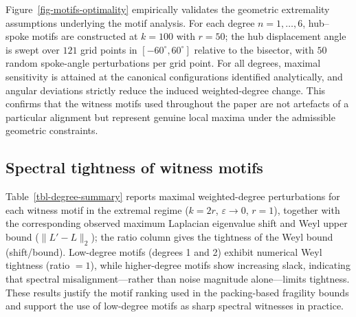 \documentclass[
  11pt,
  letterpaper]{siamart251216}
\begin{document}
Figure~\ref{fig-motifs-optimality} empirically validates the geometric
extremality assumptions underlying the motif analysis. For each degree
\(n=1,\dots,6\), hub--spoke motifs are constructed at \(k=100\) with
\(r=50\); the hub displacement angle is swept over \(121\) grid points
in \([-60^\circ,60^\circ]\) relative to the bisector, with \(50\) random
spoke-angle perturbations per grid point. For all degrees, maximal
sensitivity is attained at the canonical configurations identified
analytically, and angular deviations strictly reduce the induced
weighted-degree change. This confirms that the witness motifs used
throughout the paper are not artefacts of a particular alignment but
represent genuine local maxima under the admissible geometric
constraints.

\subsection{Spectral tightness of witness
motifs}\label{sec-motif-tightness-results}

Table~\ref{tbl-degree-summary} reports maximal weighted-degree
perturbations for each witness motif in the extremal regime (\(k=2r\),
\(\varepsilon\to 0\), \(r=1\)), together with the corresponding observed
maximum Laplacian eigenvalue shift and Weyl upper bound
(\(\|L'-L\|_2\)); the ratio column gives the tightness of the Weyl bound
(shift/bound). Low-degree motifs (degrees 1 and 2) exhibit numerical
Weyl tightness (ratio \(=1\)), while higher-degree motifs show
increasing slack, indicating that spectral misalignment---rather than
noise magnitude alone---limits tightness. These results justify the
motif ranking used in the packing-based fragility bounds and support the
use of low-degree motifs as sharp spectral witnesses in practice.
\end{document}
